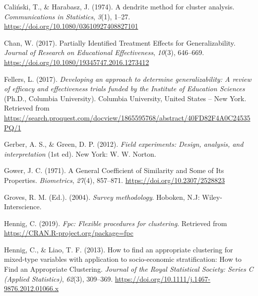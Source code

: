 \documentclass[
  man,floatsintext]{apa6}
\newlength{\cslhangindent}
\newlength{\cslentryspacingunit} %
\newenvironment{CSLReferences}[2] %
 {%
  \setlength{\parindent}{0pt}
  \ifodd #1
  \let\oldpar\par
  \def\par{\hangindent=\cslhangindent\oldpar}
  \fi
  \setlength{\parskip}{#2\cslentryspacingunit}
 }%
 {}
\begin{document}
\hypertarget{refs}{}
\begin{CSLReferences}{1}{0}
\leavevmode{}%
Caliński, T., \& Harabasz, J. (1974). A dendrite method for cluster analysis. \emph{Communications in Statistics}, \emph{3}(1), 1--27. \url{https://doi.org/10.1080/03610927408827101}

\leavevmode{}%
Chan, W. (2017). Partially {Identified} {Treatment} {Effects} for {Generalizability}. \emph{Journal of Research on Educational Effectiveness}, \emph{10}(3), 646--669. \url{https://doi.org/10.1080/19345747.2016.1273412}

\leavevmode{}%
Fellers, L. (2017). \emph{Developing an approach to determine generalizability: {A} review of efficacy and effectiveness trials funded by the {Institute} of {Education Sciences}} (Ph.D., Columbia University). Columbia University, United States -- New York. Retrieved from \url{https://search.proquest.com/docview/1865595768/abstract/40FD82F4A0C24535PQ/1}

\leavevmode{}%
Gerber, A. S., \& Green, D. P. (2012). \emph{Field experiments: Design, analysis, and interpretation} (1st ed). New York: W. W. Norton.

\leavevmode{}%
Gower, J. C. (1971). A {General Coefficient} of {Similarity} and {Some} of {Its Properties}. \emph{Biometrics}, \emph{27}(4), 857--871. \url{https://doi.org/10.2307/2528823}

\leavevmode{}%
Groves, R. M. (Ed.). (2004). \emph{Survey methodology}. Hoboken, N.J: Wiley-Interscience.

\leavevmode{}%
Hennig, C. (2019). \emph{Fpc: Flexible procedures for clustering}. Retrieved from \url{https://CRAN.R-project.org/package=fpc}

\leavevmode{}%
Hennig, C., \& Liao, T. F. (2013). How to find an appropriate clustering for mixed-type variables with application to socio-economic stratification: {How} to {Find} an {Appropriate Clustering}. \emph{Journal of the Royal Statistical Society: Series C (Applied Statistics)}, \emph{62}(3), 309--369. \url{https://doi.org/10.1111/j.1467-9876.2012.01066.x}


\end{CSLReferences}
\end{document}
